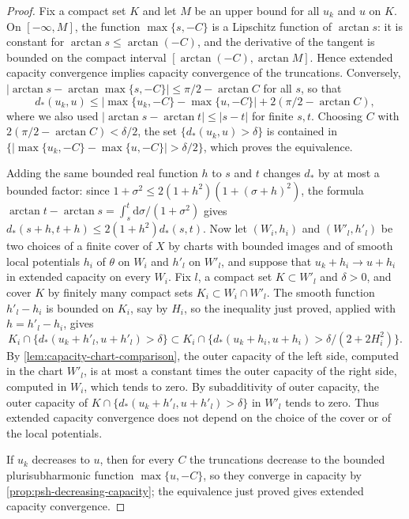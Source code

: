 \begin{proof}
Fix a compact set $K$ and let $M$ be an upper bound for all $u_k$ and $u$ on $K$. On $[-\infty,M]$, the function $\max\{s,-C\}$ is a Lipschitz function of $\arctan s$: it is constant for $\arctan s\leq\arctan(-C)$, and the derivative of the tangent is bounded on the compact interval $[\arctan(-C),\arctan M]$. Hence extended capacity convergence implies capacity convergence of the truncations. Conversely, $|\arctan s-\arctan\max\{s,-C\}|\leq\pi/2-\arctan C$ for all $s$, so that
\[
 d_*(u_k,u)\leq|\max\{u_k,-C\}-\max\{u,-C\}|+2(\pi/2-\arctan C),
\]
where we also used $|\arctan s-\arctan t|\leq|s-t|$ for finite $s,t$. Choosing $C$ with $2(\pi/2-\arctan C)<\delta/2$, the set $\{d_*(u_k,u)>\delta\}$ is contained in $\{|\max\{u_k,-C\}-\max\{u,-C\}|>\delta/2\}$, which proves the equivalence.

Adding the same bounded real function $h$ to $s$ and $t$ changes $d_*$ by at most a bounded factor: since $1+\sigma^2\leq2(1+h^2)(1+(\sigma+h)^2)$, the formula $\arctan t-\arctan s=\int_s^t\mathrm d\sigma/(1+\sigma^2)$ gives $d_*(s+h,t+h)\leq2(1+h^2)d_*(s,t)$. Now let $(W_i,h_i)$ and $(W'_l,h'_l)$ be two choices of a finite cover of $X$ by charts with bounded images and of smooth local potentials $h_i$ of $\theta$ on $W_i$ and $h'_l$ on $W'_l$, and suppose that $u_k+h_i\to u+h_i$ in extended capacity on every $W_i$. Fix $l$, a compact set $K\subset W'_l$ and $\delta>0$, and cover $K$ by finitely many compact sets $K_i\subset W_i\cap W'_l$. The smooth function $h'_l-h_i$ is bounded on $K_i$, say by $H_i$, so the inequality just proved, applied with $h=h'_l-h_i$, gives
\[
 K_i\cap\{d_*(u_k+h'_l,u+h'_l)>\delta\}\subset K_i\cap\{d_*(u_k+h_i,u+h_i)>\delta/(2+2H_i^2)\}.
\]
By \cref{lem:capacity-chart-comparison}, the outer capacity of the left side, computed in the chart $W'_l$, is at most a constant times the outer capacity of the right side, computed in $W_i$, which tends to zero. By subadditivity of outer capacity, the outer capacity of $K\cap\{d_*(u_k+h'_l,u+h'_l)>\delta\}$ in $W'_l$ tends to zero. Thus extended capacity convergence does not depend on the choice of the cover or of the local potentials.

If $u_k$ decreases to $u$, then for every $C$ the truncations decrease to the bounded plurisubharmonic function $\max\{u,-C\}$, so they converge in capacity by \cref{prop:psh-decreasing-capacity}; the equivalence just proved gives extended capacity convergence.


\end{proof}

